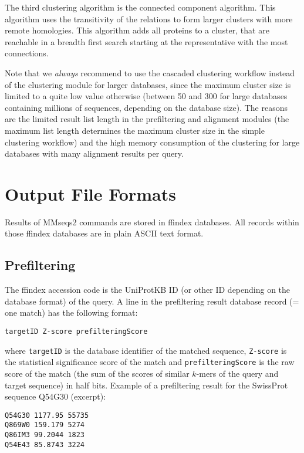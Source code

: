 \documentclass[11pt,a4paper]{scrreprt}
\begin{document}
The third clustering algorithm is the connected component algorithm. This algorithm uses the transitivity of the relations to form larger clusters with more remote homologies. This algorithm adds all proteins to a cluster, that are reachable in a breadth first search starting at the representative with the most connections.

Note that we \emph{always} recommend to use the cascaded clustering workflow instead of the clustering module for larger databases, since the maximum cluster size is limited to a quite low value otherwise (between 50 and 300 for large databases containing millions of sequences, depending on the database size). The reasons are the limited result list length in the prefiltering and alignment modules (the maximum list length determines the maximum cluster size in the simple clustering workflow) and the high memory consumption of the clustering for large databases with many alignment results per query.

\section{Output File Formats}
Results of MMseqs2 commands are stored in ffindex databases. All records within those ffindex databases are in plain ASCII text format. 
\subsection{Prefiltering}
The ffindex accession code is the UniProtKB ID (or other ID depending on the database format) of the query. A line in the prefiltering result database record (= one match) has the following format:

\begin{verbatim}
targetID Z-score prefilteringScore
\end{verbatim}

where \texttt{targetID} is the database identifier of the matched sequence, \texttt{Z-score} is the statistical significance score of the match and \texttt{prefilteringScore} is the raw score of the match (the sum of the scores of similar $k$-mers of the query and target sequence) in half bits. Example of a prefiltering result for the SwissProt sequence Q54G30 (excerpt):

\begin{verbatim}
Q54G30 1177.95 55735
Q869W0 159.179 5274
Q86IM3 99.2044 1823
Q54E43 85.8743 3224
\end{verbatim}
\end{document}
